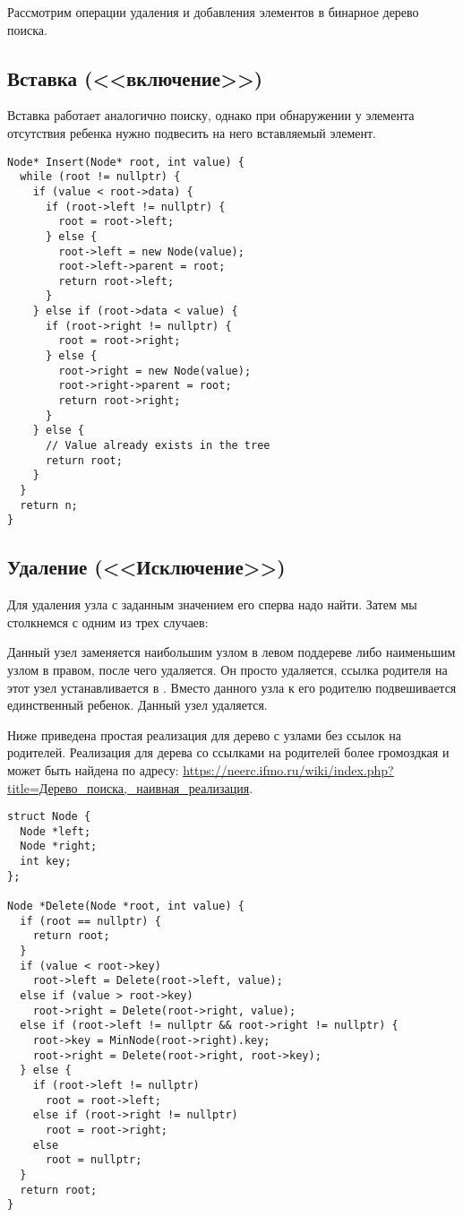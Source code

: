 Рассмотрим операции удаления и добавления элементов в бинарное дерево поиска.
\subsection{Вставка (<<включение>>)}
Вставка работает аналогично поиску, однако при обнаружении у элемента отсутствия ребенка
нужно подвесить на него вставляемый элемент.
\begin{verbatim}
Node* Insert(Node* root, int value) {
  while (root != nullptr) {
    if (value < root->data) {
      if (root->left != nullptr) {
        root = root->left;
      } else {
        root->left = new Node(value);
        root->left->parent = root;
        return root->left;
      }
    } else if (root->data < value) {
      if (root->right != nullptr) {
        root = root->right;
      } else {
        root->right = new Node(value);
        root->right->parent = root;
        return root->right;
      }
    } else {
      // Value already exists in the tree
      return root;
    }
  }
  return n;
}
\end{verbatim}
\subsection{Удаление (<<Исключение>>)}
Для удаления узла с заданным значением его сперва надо найти. Затем мы столкнемся с одним из трех случаев:
\begin{enumerate}
   Данный узел заменяется наибольшим узлом в левом поддереве либо наименьшим узлом в правом, после чего удаляется.
   Он просто удаляется, ссылка родителя на этот узел устанавливается в .
   Вместо данного узла к его родителю подвешивается единственный ребенок. Данный узел удаляется.
\end{enumerate}
Ниже приведена простая реализация для дерево с узлами без ссылок на родителей. Реализация для дерева
со ссылками на родителей более громоздкая и может быть найдена по адресу:
\url{https://neerc.ifmo.ru/wiki/index.php?title=Дерево_поиска,_наивная_реализация}.
\begin{verbatim}
struct Node {
  Node *left;
  Node *right;
  int key;
};

Node *Delete(Node *root, int value) {
  if (root == nullptr) {
    return root;
  }
  if (value < root->key)
    root->left = Delete(root->left, value);
  else if (value > root->key)
    root->right = Delete(root->right, value);
  else if (root->left != nullptr && root->right != nullptr) {
    root->key = MinNode(root->right).key;
    root->right = Delete(root->right, root->key);
  } else {
    if (root->left != nullptr)
      root = root->left;
    else if (root->right != nullptr)
      root = root->right;
    else
      root = nullptr;
  }
  return root;
}
\end{verbatim}